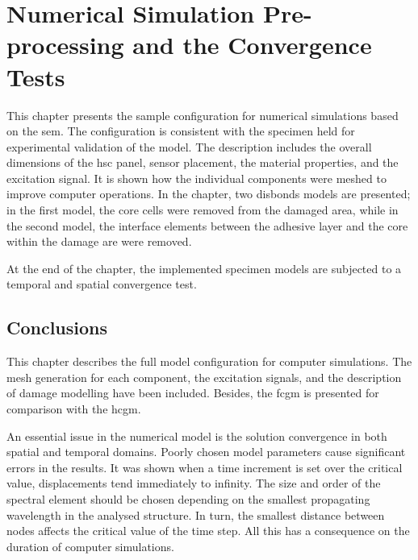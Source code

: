 
\chapter[Numerical Simulation Pre-processing and the Convergence Tests]{Numerical Simulation Pre-processing and the Convergence Tests}
\label{ch:simulation}

This chapter presents the sample configuration for numerical simulations based on the \ac{sem}.
The configuration is consistent with the specimen held for experimental validation of the model.
The description includes the overall dimensions of the \ac{hsc} panel, sensor placement, the material properties, and the excitation signal.
It is shown how the individual components were meshed to improve computer operations.
In the chapter, two disbonds models are presented; in the first model, the core cells were removed from the damaged area, while in the second model, the interface elements between the adhesive layer and the core within the damage are were removed.

At the end of the chapter, the implemented specimen models are subjected to a temporal and spatial convergence test.









\section{Conclusions}
\label{sec:conclusionsSimul}

This chapter describes the full model configuration for computer simulations.
The mesh generation for each component, the excitation signals, and the description of damage modelling have been included.
Besides, the \ac{fcgm} is presented for comparison with the \ac{hcgm}.

An essential issue in the numerical model is the solution convergence in both spatial and temporal domains.
Poorly chosen model parameters cause significant errors in the results.
It was shown when a time increment is set over the critical value, displacements tend immediately to infinity.
The size and order of the spectral element should be chosen depending on the smallest propagating wavelength in the analysed structure.
In turn, the smallest distance between nodes affects the critical value of the time step.
All this has a consequence on the duration of computer simulations.